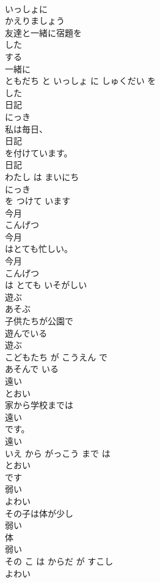 \documentclass[8pt]{extreport}
\begin{document}
\begin{CJK}{UTF8}{min}
\\	いっしょに
\\	かえりましょう	
\\	友達と一緒に宿題を
\\	した
\\	する 
\\	一緒に 
\\	ともだち と いっしょ に しゅくだい を 
\\	した
\\	日記	
\\	にっき	
\\	私は毎日、
\\	日記
\\	を付けています。	
\\	日記 
\\	わたし は まいにち 
\\	にっき
\\	を つけて います	
\\	今月	
\\	こんげつ	
\\	今月
\\	はとても忙しい。	
\\	今月 
\\	こんげつ
\\	は とても いそがしい	
\\	遊ぶ	
\\	あそぶ	
\\	子供たちが公園で
\\	遊んでいる
\\	遊ぶ 
\\	こどもたち が こうえん で 
\\	あそんで いる
\\	遠い	
\\	とおい	
\\	家から学校までは
\\	遠い
\\	です。	
\\	遠い 
\\	いえ から がっこう まで は 
\\	とおい
\\	です	
\\	弱い	
\\	よわい	
\\	その子は体が少し
\\	弱い
\\	体 
\\	弱い 
\\	その こ は からだ が すこし 
\\	よわい

\end{CJK}
\end{document}
